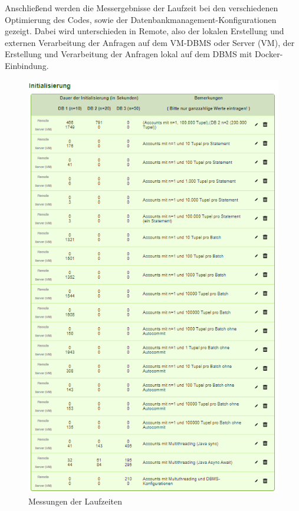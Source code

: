Anschließend werden die Messergebnisse der Laufzeit bei den verschiedenen Optimierung des Codes, sowie der Datenbankmanagement-Konfigurationen gezeigt.
Dabei wird unterschieden in Remote, also der lokalen Erstellung und externen Verarbeitung der Anfragen auf dem VM-DBMS oder Server (VM), der Erstellung und Verarbeitung der Anfragen lokal auf dem DBMS mit Docker-Einbindung.
\begin{figure}[h!]
    \center
    \includegraphics[width=\paperwidth/2]{assets/img/messungen}
    \caption{Messungen der Laufzeiten}
    \label{fig:messungen}
\end{figure}
